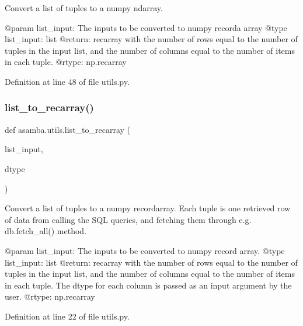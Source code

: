 \begin{DoxyVerb}Convert a list of tuples to a numpy ndarray. 

@param list_input: The inputs to be converted to numpy recorda array
@type list_input: list
@return: recarray with the number of rows equal to the number of tuples in the input list, and the 
      number of columns equal to the number of items in each tuple.
@rtype: np.recarray
\end{DoxyVerb}
 

Definition at line 48 of file utils.\+py.

\mbox{\label{namespaceasamba_1_1utils_aa37a19f15b6c956eb813b052f8971f09}} 
\subsubsection{\texorpdfstring{list\+\_\+to\+\_\+recarray()}{list\_to\_recarray()}}
{\footnotesize\ttfamily def asamba.\+utils.\+list\+\_\+to\+\_\+recarray (\begin{DoxyParamCaption}\item[{}]{list\+\_\+input,  }\item[{}]{dtype }\end{DoxyParamCaption})}

\begin{DoxyVerb}Convert a list of tuples to a numpy recordarray. Each tuple is one retrieved row of data from calling
the SQL queries, and fetching them through e.g. db.fetch_all() method.

@param list_input: The inputs to be converted to numpy record array. 
@type list_input: list
@return: recarray with the number of rows equal to the number of tuples in the input list, and the 
      number of columns equal to the number of items in each tuple. The dtype for each column is 
      passed as an input argument by the user.
@rtype: np.recarray
\end{DoxyVerb}
 

Definition at line 22 of file utils.\+py.

\mbox{\label{namespaceasamba_1_1utils_af201868f9291b34bea14c4635687c190}} 
